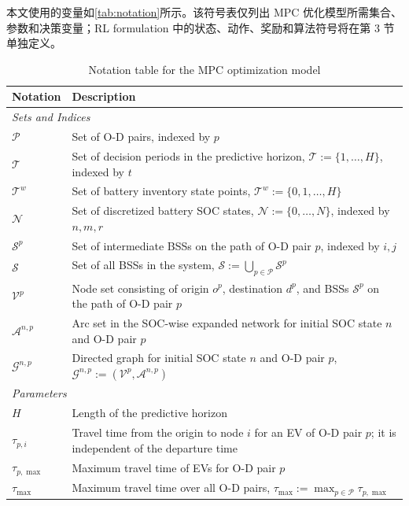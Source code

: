 \documentclass[12pt,hyperref,a4paper,UTF8]{ctexart}
\begin{document}
本文使用的变量如\autoref{tab:notation}所示。该符号表仅列出 MPC 优化模型所需集合、参数和决策变量；RL formulation 中的状态、动作、奖励和算法符号将在第 3 节单独定义。

\begin{table}[!htbp]
  \centering
  \caption{Notation table for the MPC optimization model}
  \label{tab:notation}
  \footnotesize
  \setlength{\tabcolsep}{2pt}
  \renewcommand{\arraystretch}{0.88}
  \begin{tabular}{@{}lp{13cm}@{}}
    \toprule
    \textbf{Notation} & \textbf{Description} \\
    \midrule
    \multicolumn{2}{l}{\textit{Sets and Indices}} \\
    $\mathcal{P}$ & Set of O-D pairs, indexed by $p$ \\
    $\mathcal{T}$ & Set of decision periods in the predictive horizon, $\mathcal{T}:=\{1,\dots,H\}$, indexed by $t$ \\
    $\mathcal{T}^{w}$ & Set of battery inventory state points, $\mathcal{T}^{w}:=\{0,1,\dots,H\}$ \\
    $\mathcal{N}$ & Set of discretized battery SOC states, $\mathcal{N}:=\{0,\dots,N\}$, indexed by $n,m,r$ \\
    $\mathcal{S}^{p}$ & Set of intermediate BSSs on the path of O-D pair $p$, indexed by $i,j$ \\
    $\mathcal{S}$ & Set of all BSSs in the system, $\mathcal{S}:=\bigcup_{p\in\mathcal{P}}\mathcal{S}^{p}$ \\
    $\mathcal{V}^{p}$ & Node set consisting of origin $o^{p}$, destination $d^{p}$, and BSSs $\mathcal{S}^{p}$ on the path of O-D pair $p$ \\
    $\mathcal{A}^{n,p}$ & Arc set in the SOC-wise expanded network for initial SOC state $n$ and O-D pair $p$ \\
    $\mathcal{G}^{n,p}$ & Directed graph for initial SOC state $n$ and O-D pair $p$, $\mathcal{G}^{n,p}:=(\mathcal{V}^{p},\mathcal{A}^{n,p})$ \\
    \midrule
    \multicolumn{2}{l}{\textit{Parameters}} \\
    $H$ & Length of the predictive horizon \\
    $\tau_{p,i}$ & Travel time from the origin to node $i$ for an EV of O-D pair $p$; it is independent of the departure time \\
    $\tau_{p,\max}$ & Maximum travel time of EVs for O-D pair $p$ \\
    $\tau_{\max}$ & Maximum travel time over all O-D pairs, $\tau_{\max}:=\max_{p\in\mathcal{P}}\tau_{p,\max}$ \\

\end{tabular}
\end{table}
\end{document}
